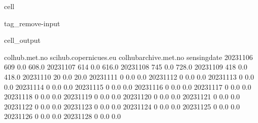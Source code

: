\documentclass[letterpaper,10pt,english]{jupyterBook}
\begin{document}
\begin{sphinxuseclass}{cell}
\begin{sphinxuseclass}{tag_remove-input}\begin{sphinxVerbatimOutput}

\begin{sphinxuseclass}{cell_output}
\begin{sphinxVerbatim}[commandchars=\\\{\}]
              colhub.met.no  scihub.copernicues.eu  colhub\PYGZhy{}archive.met.no  \PYGZbs{}
sensing\PYGZus{}date                                                                
2023\PYGZhy{}11\PYGZhy{}06              609                    0.0                  608.0   
2023\PYGZhy{}11\PYGZhy{}07              614                    0.0                  616.0   
2023\PYGZhy{}11\PYGZhy{}08              745                    0.0                  728.0   
2023\PYGZhy{}11\PYGZhy{}09              418                    0.0                  418.0   
2023\PYGZhy{}11\PYGZhy{}10               20                    0.0                   20.0   
2023\PYGZhy{}11\PYGZhy{}11                0                    0.0                    0.0   
2023\PYGZhy{}11\PYGZhy{}12                0                    0.0                    0.0   
2023\PYGZhy{}11\PYGZhy{}13                0                    0.0                    0.0   
2023\PYGZhy{}11\PYGZhy{}14                0                    0.0                    0.0   
2023\PYGZhy{}11\PYGZhy{}15                0                    0.0                    0.0   
2023\PYGZhy{}11\PYGZhy{}16                0                    0.0                    0.0   
2023\PYGZhy{}11\PYGZhy{}17                0                    0.0                    0.0   
2023\PYGZhy{}11\PYGZhy{}18                0                    0.0                    0.0   
2023\PYGZhy{}11\PYGZhy{}19                0                    0.0                    0.0   
2023\PYGZhy{}11\PYGZhy{}20                0                    0.0                    0.0   
2023\PYGZhy{}11\PYGZhy{}21                0                    0.0                    0.0   
2023\PYGZhy{}11\PYGZhy{}22                0                    0.0                    0.0   
2023\PYGZhy{}11\PYGZhy{}23                0                    0.0                    0.0   
2023\PYGZhy{}11\PYGZhy{}24                0                    0.0                    0.0   
2023\PYGZhy{}11\PYGZhy{}25                0                    0.0                    0.0   
2023\PYGZhy{}11\PYGZhy{}26                0                    0.0                    0.0   
2023\PYGZhy{}11\PYGZhy{}28                0                    0.0                    0.0   

\end{sphinxVerbatim}
\end{sphinxuseclass}
\end{sphinxVerbatimOutput}
\end{sphinxuseclass}
\end{sphinxuseclass}
\end{document}
